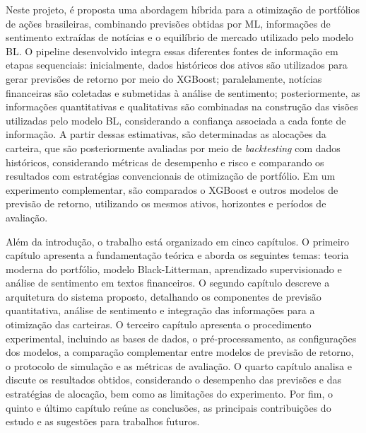 Neste projeto, é proposta uma abordagem híbrida para a otimização de portfólios de ações brasileiras, combinando previsões obtidas por ML, informações de sentimento extraídas de notícias e o equilíbrio de mercado utilizado pelo modelo BL. O pipeline desenvolvido integra essas diferentes fontes de informação em etapas sequenciais: inicialmente, dados históricos dos ativos são utilizados para gerar previsões de retorno por meio do XGBoost; paralelamente, notícias financeiras são coletadas e submetidas à análise de sentimento; posteriormente, as informações quantitativas e qualitativas são combinadas na construção das visões utilizadas pelo modelo BL, considerando a confiança associada a cada fonte de informação. A partir dessas estimativas, são determinadas as alocações da carteira, que são posteriormente avaliadas por meio de \textit{backtesting} com dados históricos, considerando métricas de desempenho e risco e comparando os resultados com estratégias convencionais de otimização de portfólio. Em um experimento complementar, são comparados o XGBoost e outros modelos de previsão de retorno, utilizando os mesmos ativos, horizontes e períodos de avaliação.

Além da introdução, o trabalho está organizado em cinco capítulos. O primeiro capítulo apresenta a fundamentação teórica e aborda os seguintes temas: teoria moderna do portfólio, modelo Black-Litterman, aprendizado supervisionado e análise de sentimento em textos financeiros. O segundo capítulo descreve a arquitetura do sistema proposto, detalhando os componentes de previsão quantitativa, análise de sentimento e integração das informações para a otimização das carteiras. O terceiro capítulo apresenta o procedimento experimental, incluindo as bases de dados, o pré-processamento, as configurações dos modelos, a comparação complementar entre modelos de previsão de retorno, o protocolo de simulação e as métricas de avaliação. O quarto capítulo analisa e discute os resultados obtidos, considerando o desempenho das previsões e das estratégias de alocação, bem como as limitações do experimento. Por fim, o quinto e último capítulo reúne as conclusões, as principais contribuições do estudo e as sugestões para trabalhos futuros.

